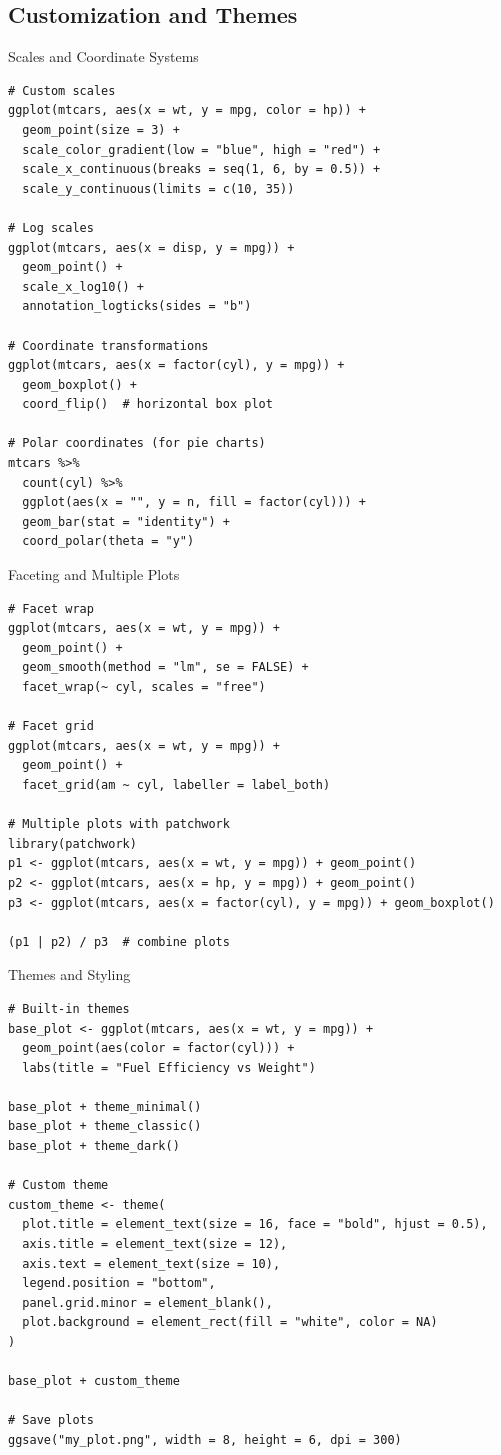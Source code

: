 \documentclass[aspectratio=169]{beamer}
\begin{document}
\subsection{Customization and Themes}

\begin{frame}[fragile]{Scales and Coordinate Systems}
\begin{lstlisting}
# Custom scales
ggplot(mtcars, aes(x = wt, y = mpg, color = hp)) +
  geom_point(size = 3) +
  scale_color_gradient(low = "blue", high = "red") +
  scale_x_continuous(breaks = seq(1, 6, by = 0.5)) +
  scale_y_continuous(limits = c(10, 35))

# Log scales
ggplot(mtcars, aes(x = disp, y = mpg)) +
  geom_point() +
  scale_x_log10() +
  annotation_logticks(sides = "b")

# Coordinate transformations
ggplot(mtcars, aes(x = factor(cyl), y = mpg)) +
  geom_boxplot() +
  coord_flip()  # horizontal box plot

# Polar coordinates (for pie charts)
mtcars %>%
  count(cyl) %>%
  ggplot(aes(x = "", y = n, fill = factor(cyl))) +
  geom_bar(stat = "identity") +
  coord_polar(theta = "y")
\end{lstlisting}
\end{frame}

\begin{frame}[fragile]{Faceting and Multiple Plots}
\begin{lstlisting}
# Facet wrap
ggplot(mtcars, aes(x = wt, y = mpg)) +
  geom_point() +
  geom_smooth(method = "lm", se = FALSE) +
  facet_wrap(~ cyl, scales = "free")

# Facet grid
ggplot(mtcars, aes(x = wt, y = mpg)) +
  geom_point() +
  facet_grid(am ~ cyl, labeller = label_both)

# Multiple plots with patchwork
library(patchwork)
p1 <- ggplot(mtcars, aes(x = wt, y = mpg)) + geom_point()
p2 <- ggplot(mtcars, aes(x = hp, y = mpg)) + geom_point()
p3 <- ggplot(mtcars, aes(x = factor(cyl), y = mpg)) + geom_boxplot()

(p1 | p2) / p3  # combine plots
\end{lstlisting}
\end{frame}

\begin{frame}[fragile]{Themes and Styling}
\begin{lstlisting}
# Built-in themes
base_plot <- ggplot(mtcars, aes(x = wt, y = mpg)) +
  geom_point(aes(color = factor(cyl))) +
  labs(title = "Fuel Efficiency vs Weight")

base_plot + theme_minimal()
base_plot + theme_classic()
base_plot + theme_dark()

# Custom theme
custom_theme <- theme(
  plot.title = element_text(size = 16, face = "bold", hjust = 0.5),
  axis.title = element_text(size = 12),
  axis.text = element_text(size = 10),
  legend.position = "bottom",
  panel.grid.minor = element_blank(),
  plot.background = element_rect(fill = "white", color = NA)
)

base_plot + custom_theme

# Save plots
ggsave("my_plot.png", width = 8, height = 6, dpi = 300)
\end{lstlisting}
\end{frame}
\end{document}
